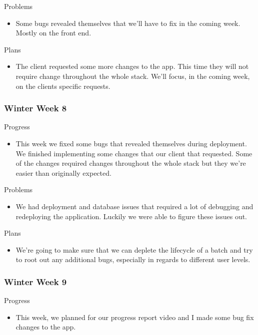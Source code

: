         \noindent
        Problems
        \begin{itemize}
            \item Some bugs revealed themselves that we'll have to fix in the coming week. Mostly on the front end.
        \end{itemize}
        
        \noindent
        Plans
        \begin{itemize}
            \item The client requested some more changes to the app. This time they will not require change throughout the whole stack. We'll focus, in the coming week, on the clients specific requests. 
        \end{itemize}
    \subsubsection{Winter Week 8}
        \noindent
        Progress
        \begin{itemize}
            \item This week we fixed some bugs that revealed themselves during deployment. We finished implementing some changes that our client that requested. Some of the changes required changes throughout the whole stack but they we're easier than originally expected.
        \end{itemize}
        
        \noindent
        Problems
        \begin{itemize}
            \item We had deployment and database issues that required a lot of debugging and redeploying the application. Luckily we were able to figure these issues out.
        \end{itemize}
        
        \noindent
        Plans
        \begin{itemize}
            \item We're going to make sure that we can deplete the lifecycle of a batch and try to root out any additional bugs, especially in regards to different user levels.
        \end{itemize}
    \subsubsection{Winter Week 9}
        \noindent
        Progress
        \begin{itemize}
            \item This week, we planned for our progress report video and I made some bug fix changes to the app.
        \end{itemize}
        
